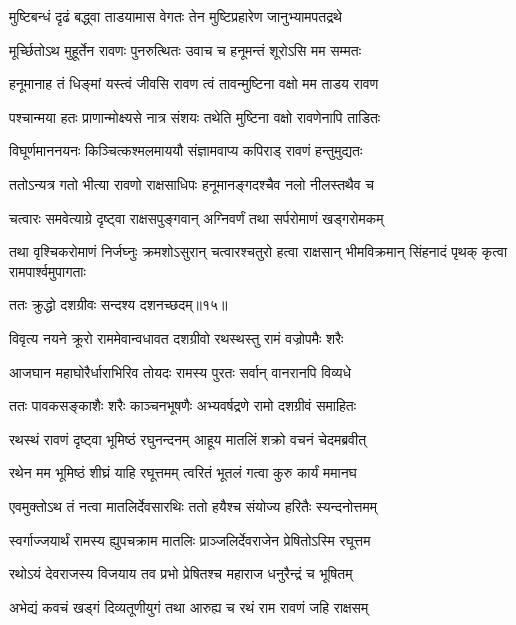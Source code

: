 \twolineshloka
{मुष्टिबन्धं दृढं बद्ध्वा ताडयामास वेगतः}
{तेन मुष्टिप्रहारेण जानुभ्यामपतद्रथे} %

\twolineshloka
{मूर्च्छितोऽथ मुहूर्तेन रावणः पुनरुत्थितः}
{उवाच च हनूमन्तं शूरोऽसि मम सम्मतः} %

\twolineshloka
{हनूमानाह तं धिङ्मां यस्त्वं जीवसि रावण}
{त्वं तावन्मुष्टिना वक्षो मम ताडय रावण} %

\twolineshloka
{पश्चान्मया हतः प्राणान्मोक्ष्यसे नात्र संशयः}
{तथेति मुष्टिना वक्षो रावणेनापि ताडितः} %

\twolineshloka
{विघूर्णमाननयनः किञ्चित्कश्मलमाययौ}
{संज्ञामवाप्य कपिराड् रावणं हन्तुमुद्यतः} %

\twolineshloka
{ततोऽन्यत्र गतो भीत्या रावणो राक्षसाधिपः}
{हनूमानङ्गदश्चैव नलो नीलस्तथैव च} %

\twolineshloka
{चत्वारः समवेत्याग्रे दृष्ट्वा राक्षसपुङ्गवान्}
{अग्निवर्णं तथा सर्परोमाणं खड्गरोमकम्} %

\threelineshloka
{तथा वृश्चिकरोमाणं निर्जघ्नुः क्रमशोऽसुरान्}
{चत्वारश्चतुरो हत्वा राक्षसान् भीमविक्रमान्}
{सिंहनादं पृथक् कृत्वा रामपार्श्वमुपागताः} %

{ततः क्रुद्धो दशग्रीवः सन्दश्य दशनच्छदम्॥१५॥} %


\twolineshloka
{विवृत्य नयने क्रूरो राममेवान्वधावत}
{दशग्रीवो रथस्थस्तु रामं वज्रोपमैः शरैः} %

\twolineshloka
{आजघान महाघोरैर्धाराभिरिव तोयदः}
{रामस्य पुरतः सर्वान् वानरानपि विव्यधे} %

\twolineshloka
{ततः पावकसङ्काशैः शरैः काञ्चनभूषणैः}
{अभ्यवर्षद्रणे रामो दशग्रीवं समाहितः} %

\twolineshloka
{रथस्थं रावणं दृष्ट्वा भूमिष्ठं रघुनन्दनम्}
{आहूय मातलिं शक्रो वचनं चेदमब्रवीत्} %

\twolineshloka
{रथेन मम भूमिष्ठं शीघ्रं याहि रघूत्तमम्}
{त्वरितं भूतलं गत्वा कुरु कार्यं ममानघ} %

\twolineshloka
{एवमुक्तोऽथ तं नत्वा मातलिर्देवसारथिः}
{ततो हयैश्च संयोज्य हरितैः स्यन्दनोत्तमम्} %

\twolineshloka
{स्वर्गाज्जयार्थं रामस्य ह्युपचक्राम मातलिः}
{प्राञ्जलिर्देवराजेन प्रेषितोऽस्मि रघूत्तम} %

\twolineshloka
{रथोऽयं देवराजस्य विजयाय तव प्रभो}
{प्रेषितश्च महाराज धनुरैन्द्रं च भूषितम्} %

\twolineshloka
{अभेद्यं कवचं खड्गं दिव्यतूणीयुगं तथा}
{आरुह्य च रथं राम रावणं जहि राक्षसम्} %

